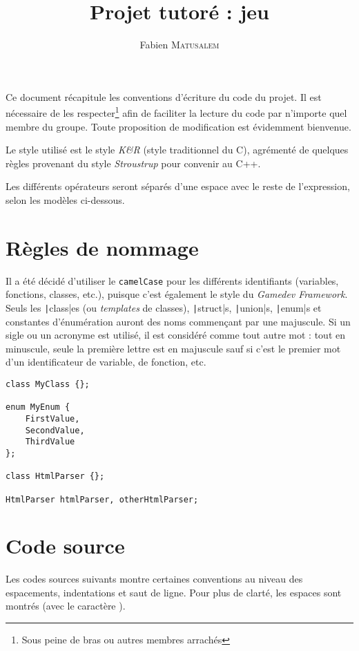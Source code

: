 \documentclass[12pt,a4paper]{article}
\author{Fabien \textsc{Matusalem}}
\title{Projet tutoré : jeu \flenglish{tactical} \\ \flenglish{Coding Standard}}
\date{}
\newcommand{\flenglish}[1]{\emph{\foreignlanguage{english}{#1}}}
\begin{document}
\maketitle

Ce document récapitule les conventions d'écriture du code du projet. Il est nécessaire de les respecter\footnote{Sous peine de bras ou autres membres arrachés} afin de faciliter la lecture du code par n'importe quel membre du groupe. Toute proposition de modification est évidemment bienvenue.

Le style utilisé est le style \emph{K\&R} (style traditionnel du C), agrémenté de quelques règles provenant du style \emph{Stroustrup} pour convenir au C++.

Les différents opérateurs seront séparés d'une espace avec le reste de l'expression, selon les modèles ci-dessous.

\section{Règles de nommage}
Il a été décidé d'utiliser le \texttt{camelCase} pour les différents identifiants (variables, fonctions, classes, etc.), puisque c'est également le style du \flenglish{Gamedev Framework}.
Seuls les \texttt|class|es (ou \flenglish{templates} de classes), \texttt|struct|s, \texttt|union|s, \texttt|enum|s et constantes d'énumération auront des noms commençant par une majuscule.
Si un sigle ou un acronyme est utilisé, il est considéré comme tout autre mot : tout en minuscule, seule la première lettre est en majuscule sauf si c'est le premier mot d'un identificateur de variable, de fonction, etc.

\begin{verbatim}
class MyClass {};

enum MyEnum {
	FirstValue,
	SecondValue,
	ThirdValue
};

class HtmlParser {};

HtmlParser htmlParser, otherHtmlParser;
\end{verbatim}

\section{Code source}

Les codes sources suivants montre certaines conventions au niveau des espacements, indentations et saut de ligne. Pour plus de clarté, les espaces sont montrés (avec le caractère \og\textvisiblespace\fg).
\end{document}
